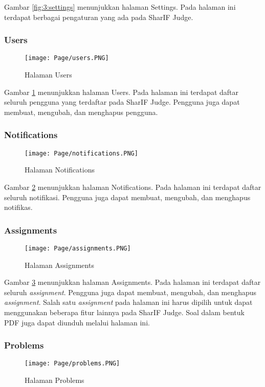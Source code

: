     Gambar \ref{fig:3:settings} menunjukkan halaman Settings. Pada halaman ini terdapat berbagai pengaturan yang ada pada SharIF Judge.
    
\subsubsection{Users}
    \begin{figure}[H]
    	\centering  
    	\texttt{[image: Page/users.PNG]}  
    	\caption{Halaman Users}
    	\label{fig:3:users} 
    \end{figure} 
    
    Gambar \ref{fig:3:users} menunjukkan halaman Users. Pada halaman ini terdapat daftar seluruh pengguna yang terdaftar pada SharIF Judge. Pengguna juga dapat membuat, mengubah, dan menghapus pengguna.
    
\subsubsection{Notifications}
    \begin{figure}[H]
    	\centering  
    	\texttt{[image: Page/notifications.PNG]}  
    	\caption{Halaman Notifications}
    	\label{fig:3:notifications} 
    \end{figure} 
    
    Gambar \ref{fig:3:notifications} menunjukkan halaman Notifications. Pada halaman ini terdapat daftar seluruh notifikasi. Pengguna juga dapat membuat, mengubah, dan menghapus notifikas.

\subsubsection{Assignments}
    \begin{figure}[H]
    	\centering  
    	\texttt{[image: Page/assignments.PNG]}  
    	\caption{Halaman Assignments}
    	\label{fig:3:assignments} 
    \end{figure} 
    
    Gambar \ref{fig:3:assignments} menunjukkan halaman Assignments. Pada halaman ini terdapat daftar seluruh \textit{assignment}. Pengguna juga dapat membuat, mengubah, dan menghapus \textit{assignment}. Salah satu \textit{assignment} pada halaman ini harus dipilih untuk dapat menggunakan beberapa fitur lainnya pada SharIF Judge. Soal dalam bentuk PDF juga dapat diunduh melalui halaman ini. 
    
\subsubsection{Problems}
    \begin{figure}[H]
    	\centering  
    	\texttt{[image: Page/problems.PNG]}  
    	\caption{Halaman Problems}
    	\label{fig:3:problems} 
    \end{figure} 
    
